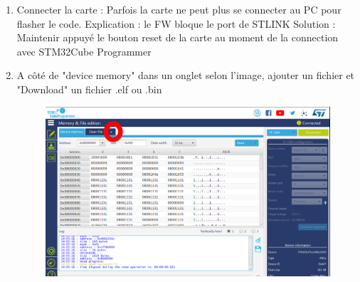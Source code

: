 \documentclass{article}
\begin{document}
\begin{itemize}
\begin{enumerate}


      \item Connecter la carte : Parfois la carte ne peut plus se connecter au PC pour flasher le code.
    Explication : le FW bloque le port de STLINK
    Solution : Maintenir appuyé le bouton reset de la carte au moment de la connection avec STM32Cube Programmer

    \item 
    A côté de "device memory" dans un onglet selon l'image, ajouter un fichier et "Download" un fichier .elf ou .bin \\
    
    
    
    
    
    \begin{figure}[H]
\begin{center}
\advance\leftskip-3cm
\advance\rightskip-3cm
\includegraphics[keepaspectratio=true,scale=0.3]{st_cube_programmer_2.png}
\label{visina8}
\end{center}\end{figure}
    
    
    

\end{enumerate}
\end{itemize}
\end{document}
